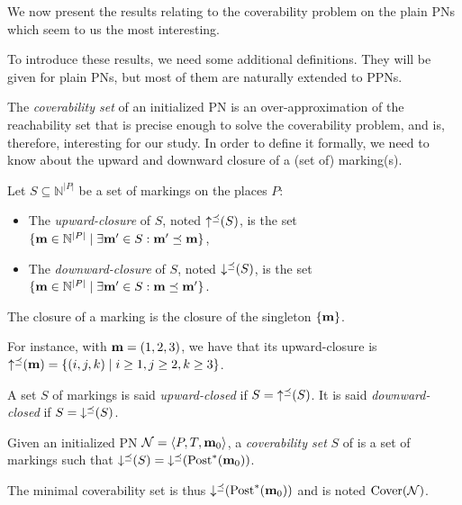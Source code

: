 We now present the results relating to the coverability problem on the plain \acp{PN} which seem to us the most interesting.

To introduce these results, we need some additional definitions.
They will be given for plain \acp{PN}, but most of them are naturally extended to \acp{PPN}.

The \emph{coverability set} of an initialized \ac{PN} is an over-approximation of the reachability set that is precise enough to solve the coverability problem, and is, therefore, interesting for our study.
In order to define it formally, we need to know about the upward and downward closure of a (set of) marking(s).

\begin{defi}
  Let $S \subseteq \mathbb{N}^{|P|}$ be a set of markings on the places $P$:
  \begin{itemize}
    \item The \emph{upward-closure} of $S$, noted $\operatorname{\uparrow^\preceq}(S)$, is the set
      $\{\mathbf{m} \in \mathbb{N}^{|P|} \mid \exists \mathbf{m'} \in S : \mathbf{m'} \preceq \mathbf{m}\}$,
    \item The \emph{downward-closure} of $S$, noted $\operatorname{\downarrow^\preceq}(S)$, is the set
      $\{\mathbf{m} \in \mathbb{N}^{|P|} \mid \exists \mathbf{m'} \in S : \mathbf{m} \preceq \mathbf{m'}\}$.
  \end{itemize}
  The closure of a marking \marq is the closure of the singleton $\{\mathbf{m}\}$.
\end{defi}

For instance, with $\mathbf{m} = (1, 2, 3)$, we have that its upward-closure is $\operatorname{\uparrow^\preceq}(\mathbf{m}) = \{(i, j, k) \mid i \geq 1, j \geq 2, k \geq 3\}$.

\begin{defi}
  A set $S$ of markings is said \emph{upward-closed} if $S = \operatorname{\uparrow^\preceq}(S)$.
  It is said \emph{downward-closed} if $S = \operatorname{\downarrow^\preceq}(S)$.
\end{defi}

\begin{defi}
  Given an initialized \ac{PN} $\mathcal{N} = \langle P,T, \mathbf{m}_0\rangle$, a \emph{coverability set} $S$ of \tupleN is a set of markings such that $\operatorname{\downarrow^\preceq}(S) = \operatorname{\downarrow^\preceq}(\operatorname{Post}^*(\mathbf{m}_0))$.
  
  The minimal coverability set is thus $\operatorname{\downarrow^\preceq}(\operatorname{Post}^*(\mathbf{m}_0))$  and is noted $\operatorname{Cover}(\mathcal{N})$.
\end{defi}

